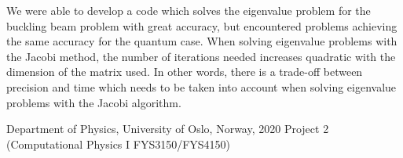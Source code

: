 \documentclass[norsk,a4paper,12pt]{article}
\begin{document}
We were able to develop a code which solves the eigenvalue problem for the buckling beam problem with great accuracy, but encountered problems achieving the same accuracy for the quantum case. When solving eigenvalue problems with the Jacobi method, the number of iterations needed increases quadratic with the dimension of the matrix used. In other words, there is a trade-off between precision and time which needs to be taken into account when solving eigenvalue problems with the Jacobi algorithm. 

\begin{thebibliography}{9}
	Department of Physics, University of Oslo, Norway, 2020 Project 2 (Computational Physics I FYS3150/FYS4150)
\end{thebibliography}
\end{document}

